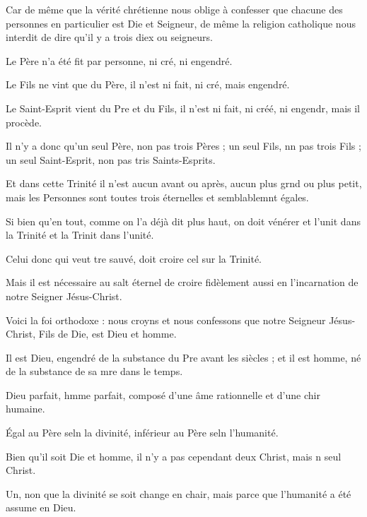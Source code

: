 \item Car de même que la vérité chrétienne nous oblige à confesser que chacune des personnes en particulier est Die et Seigneur,\psstar{} de même la religion catholique nous interdit de dire qu’il y a trois diex ou seigneurs.
\item Le Père n’a été fit par personne,\psstar{} ni cré, ni engendré.
\item Le Fils ne vint que du Père,\psstar{} il n'est ni fait, ni cré, mais engendré.
\item Le Saint-Esprit vient du Pre et du Fils,\psstar{} il n'est ni fait, ni créé, ni engendr, mais il procède.
\item Il n'y a donc qu'un seul Père, non pas trois Pères ;\pscross{} un seul Fils, nn pas trois Fils ;\psstar{} un seul Saint-Esprit, non pas tris Saints-Esprits.
\item Et dans cette Trinité il n'est aucun avant ou après,\pscross{} aucun plus grnd ou plus petit,\psstar{} mais les Personnes sont toutes trois éternelles et semblablemnt égales.
\item Si bien qu’en tout, comme on l'a déjà dit plus haut,\pscross{} on doit vénérer et l'unit dans la Trinité\psstar{} et la Trinit dans l’unité.
\item Celui donc qui veut tre sauvé,\psstar{} doit croire cel sur la Trinité.
\item Mais il est nécessaire au salt éternel\psstar{} de croire fidèlement aussi en l’incarnation de notre Seigner Jésus-Christ.
\item Voici la foi orthodoxe : nous croyns et nous confessons\psstar{} que notre Seigneur Jésus-Christ, Fils de Die, est Dieu et homme.
\item Il est Dieu, engendré de la substance du Pre avant les siècles ;\psstar{} et il est homme, né de la substance de sa mre dans le temps.
\item Dieu parfait, hmme parfait,\psstar{} composé d’une âme rationnelle et d'une chir humaine.
\item Égal au Père seln la divinité,\psstar{} inférieur au Père seln l’humanité.
\item Bien qu’il soit Die et homme,\psstar{} il n’y a pas cependant deux Christ, mais n seul Christ.
\item Un, non que la divinité se soit change en chair,\psstar{} mais parce que l’humanité a été assume en Dieu.
